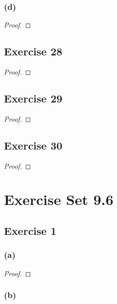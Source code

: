 \documentclass[14pt]{extarticle}
\begin{document}
\subsubsection{(d)}

\begin{proof}

\end{proof}

\subsection{Exercise 28}

\begin{proof}

\end{proof}

\subsection{Exercise 29}

\begin{proof}

\end{proof}

\subsection{Exercise 30}

\begin{proof}

\end{proof}

\section{Exercise Set 9.6}

\subsection{Exercise 1}

\subsubsection{(a)}

\begin{proof}

\end{proof}

\subsubsection{(b)}
\end{document}
